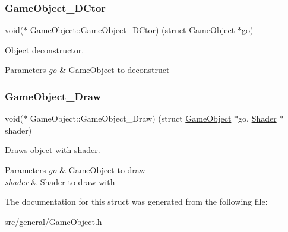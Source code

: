 \subsubsection{\texorpdfstring{GameObject\_DCtor}{GameObject\_DCtor}}
{\footnotesize\ttfamily void($\ast$ Game\+Object\+::\+Game\+Object\+\_\+\+D\+Ctor) (struct \mbox{\hyperlink{struct_game_object}{Game\+Object}} $\ast$go)}



Object deconstructor. 


\begin{DoxyParams}{Parameters}
{\em go} & \mbox{\hyperlink{struct_game_object}{Game\+Object}} to deconstruct \\
\hline
\end{DoxyParams}
\mbox{\label{struct_game_object_a4c44dbb7279c47bcd7f896d2b99f9350}} 
\subsubsection{\texorpdfstring{GameObject\_Draw}{GameObject\_Draw}}
{\footnotesize\ttfamily void($\ast$ Game\+Object\+::\+Game\+Object\+\_\+\+Draw) (struct \mbox{\hyperlink{struct_game_object}{Game\+Object}} $\ast$go, \mbox{\hyperlink{struct_shader}{Shader}} $\ast$shader)}



Draws object with shader. 


\begin{DoxyParams}{Parameters}
{\em go} & \mbox{\hyperlink{struct_game_object}{Game\+Object}} to draw \\
\hline
{\em shader} & \mbox{\hyperlink{struct_shader}{Shader}} to draw with \\
\hline
\end{DoxyParams}


The documentation for this struct was generated from the following file\+:\begin{DoxyCompactItemize}
\item 
src/general/Game\+Object.\+h\end{DoxyCompactItemize}
